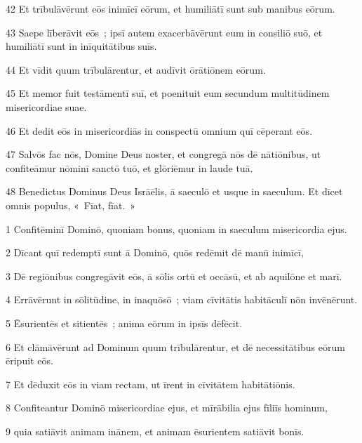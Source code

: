 \psalmVerse
  {\phantom{0}42}
  {Et trībulāvērunt eōs inimīcī eōrum, et humiliātī sunt sub manibus eōrum.}


\psalmVerse
  {\phantom{0}43}
  {Saepe līberāvit eōs~; ipsī autem exacerbāvērunt eum in consiliō suō, et humiliātī sunt in inīquitātibus suīs.}


\psalmVerse
  {\phantom{0}44}
  {Et vīdit quum trībulārentur, et audīvit ōrātiōnem eōrum.}


\psalmVerse
  {\phantom{0}45}
  {Et memor fuit testāmentī suī, et poenituit eum secundum multitūdinem misericordiae suae.}


\psalmVerse
  {\phantom{0}46}
  {Et dedit eōs in misericordiās in conspectū omnium quī cēperant eōs.}


\psalmVerse
  {\phantom{0}47}
  {Salvōs fac nōs, Domine Deus noster, et congregā nōs dē nātiōnibus, ut confiteāmur nōminī sanctō tuō, et glōriēmur in laude tuā.}


\psalmVerse
  {\phantom{0}48}
  {Benedictus Dominus Deus Isrāēlis, ā saeculō et usque in saeculum. Et dīcet omnis populus, «~Fīat, fīat.~»}




\psalmVerse
  {\phantom{00}1}
  {Confitēminī Dominō, quoniam bonus, quoniam in saeculum misericordia ejus.}


\psalmVerse
  {\phantom{00}2}
  {Dīcant quī redemptī sunt ā Dominō, quōs redēmit dē manū inimīcī,}


\psalmVerse
  {\phantom{00}3}
  {Dē regiōnibus congregāvit eōs, ā sōlis ortū et occāsū, et ab aquilōne et marī.}


\psalmVerse
  {\phantom{00}4}
  {Errāvērunt in sōlitūdine, in inaquōsō~; viam cīvitātis habitāculī nōn invēnērunt.}


\psalmVerse
  {\phantom{00}5}
  {Ēsurientēs et sitientēs~; anima eōrum in ipsīs dēfēcit.}


\psalmVerse
  {\phantom{00}6}
  {Et clāmāvērunt ad Dominum quum trībulārentur, et dē necessitātibus eōrum ēripuit eōs.}


\psalmVerse
  {\phantom{00}7}
  {Et dēduxit eōs in viam rectam, ut īrent in cīvitātem habitātiōnis.}


\psalmVerse
  {\phantom{00}8}
  {Confiteantur Dominō misericordiae ejus, et mīrābilia ejus fīliīs hominum,}


\psalmVerse
  {\phantom{00}9}
  {quia satiāvit animam inānem, et animam ēsurientem satiāvit bonīs.}


